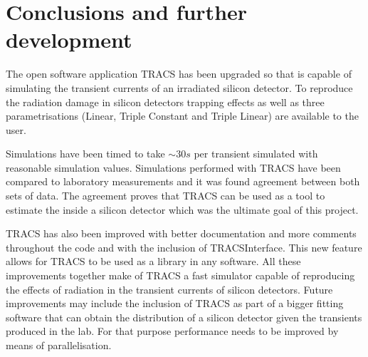\chapter{Conclusions and further development}

The open software application TRACS has been upgraded so that is capable of simulating the transient currents of an irradiated silicon detector. To reproduce the radiation damage in silicon detectors trapping effects as well as three \neff parametrisations (Linear, Triple Constant and Triple Linear) are available to the user. 

Simulations have been timed to take $\sim 30s$ per transient simulated with reasonable simulation values. Simulations performed with TRACS have been compared to laboratory measurements and it was found agreement between both sets of data. The agreement proves that TRACS can be used as a tool to estimate the \neff inside a silicon detector which was the ultimate goal of this project.

TRACS has also been improved with better documentation and more comments throughout the code and with the inclusion of TRACSInterface. This new feature allows for TRACS to be used as a library in any software.  All these improvements together make of TRACS a fast simulator capable of reproducing the effects of radiation in the transient currents of silicon detectors. Future improvements may include the inclusion of TRACS as part of a bigger fitting software that can obtain the \neff distribution of a silicon detector given the transients produced in the lab. For that purpose performance needs to be improved by means of parallelisation.


